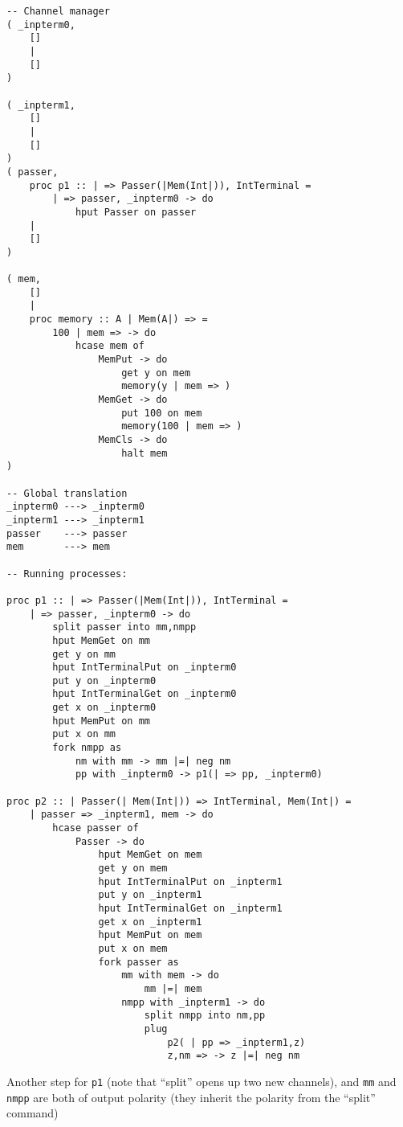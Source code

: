 \documentclass{article}
\theoremstyle{plain}%
\theoremstyle{definition}
\theoremstyle{remark}
\begin{document}
\begin{verbatim}
-- Channel manager
( _inpterm0,  
    []
    |
    []
)

( _inpterm1,  
    []
    |
    []
)
( passer,
    proc p1 :: | => Passer(|Mem(Int|)), IntTerminal = 
        | => passer, _inpterm0 -> do
            hput Passer on passer
    |
    []
)

( mem,
    []
    |
    proc memory :: A | Mem(A|) => =
        100 | mem => -> do
            hcase mem of
                MemPut -> do
                    get y on mem
                    memory(y | mem => )
                MemGet -> do
                    put 100 on mem
                    memory(100 | mem => )
                MemCls -> do
                    halt mem
)

-- Global translation
_inpterm0 ---> _inpterm0 
_inpterm1 ---> _inpterm1 
passer    ---> passer 
mem       ---> mem

-- Running processes:

proc p1 :: | => Passer(|Mem(Int|)), IntTerminal = 
    | => passer, _inpterm0 -> do
        split passer into mm,nmpp
        hput MemGet on mm 
        get y on mm
        hput IntTerminalPut on _inpterm0
        put y on _inpterm0
        hput IntTerminalGet on _inpterm0
        get x on _inpterm0
        hput MemPut on mm
        put x on mm
        fork nmpp as
            nm with mm -> mm |=| neg nm 
            pp with _inpterm0 -> p1(| => pp, _inpterm0)

proc p2 :: | Passer(| Mem(Int|)) => IntTerminal, Mem(Int|) =
    | passer => _inpterm1, mem -> do
        hcase passer of
            Passer -> do
                hput MemGet on mem
                get y on mem
                hput IntTerminalPut on _inpterm1
                put y on _inpterm1
                hput IntTerminalGet on _inpterm1
                get x on _inpterm1
                hput MemPut on mem
                put x on mem
                fork passer as
                    mm with mem -> do
                        mm |=| mem
                    nmpp with _inpterm1 -> do
                        split nmpp into nm,pp
                        plug
                            p2( | pp => _inpterm1,z)
                            z,nm => -> z |=| neg nm

\end{verbatim}
Another step for \verb|p1| (note that ``split'' opens up two new channels),
    and \verb|mm| and \verb|nmpp| are both of output polarity 
    (they inherit the polarity from the ``split'' command)
\end{document}
